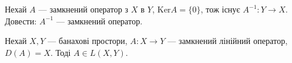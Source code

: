 \begin{exercise}\label{N:2_1_14}
    Нехай $A$ --- замкнений оператор з $X$ в $Y$, $\mathrm{Ker} A = \{ 0\}$,
    тож існує $A^{-1} : Y \to X$. Довести: $A^{-1}$ --- замкнений оператор.
\end{exercise}

\begin{theory}
    \begin{theorem*}
        Нехай $X, Y$ --- банахові простори, $A : X \to Y$ --- замкнений лінійний оператор, $D(A) = X$.
    Тоді $A \in L(X, Y)$. 
    \end{theorem*}
\end{theory}